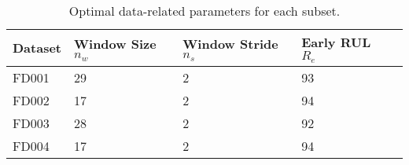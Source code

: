 \begin{table}[!htb]
\centering
\begin{tabular}{l l l l l}
	\hline
	 Dataset & Window Size $n_w$ & Window Stride $n_s$ & Early RUL $R_e$\\
  	\hline
  	FD001 & 29 & 2 & 93\\
  	FD002 & 17 & 2 & 94\\
  	FD003 & 28 & 2 & 92\\
  	FD004 & 17 & 2 & 94\\
  	\hline
\end{tabular}
\caption{Optimal data-related parameters for each subset.}
\label{table:optimal_data_params}
\end{table}